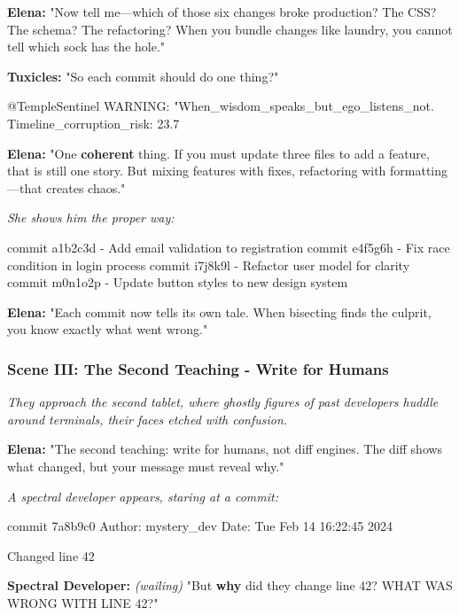 \textbf{Elena:} "Now tell me---which of those six changes broke production? The CSS? The schema? The refactoring? When you bundle changes like laundry, you cannot tell which sock has the hole."

\textbf{Tuxicles:} "So each commit should do one thing?"

\begin{codeblock}
@TempleSentinel WARNING: "When_wisdom_speaks_but_ego_listens_not. Timeline_corruption_risk: 23.7%
\end{codeblock}

\textbf{Elena:} "One \textbf{coherent} thing. If you must update three files to add a feature, that is still one story. But mixing features with fixes, refactoring with formatting---that creates chaos."

\emph{She shows him the proper way:}

\begin{codeblock}
commit a1b2c3d - Add email validation to registration
commit e4f5g6h - Fix race condition in login process  
commit i7j8k9l - Refactor user model for clarity
commit m0n1o2p - Update button styles to new design system
\end{codeblock}

\textbf{Elena:} "Each commit now tells its own tale. When bisecting finds the culprit, you know exactly what went wrong."

\bookdivider

\subsubsection{Scene III: The Second Teaching - Write for Humans}\label{scene-iii-the-second-teaching---write-for-humans}

\emph{They approach the second tablet, where ghostly figures of past developers huddle around terminals, their faces etched with confusion.}

\textbf{Elena:} "The second teaching: write for humans, not diff engines. The diff shows what changed, but your message must reveal why."

\emph{A spectral developer appears, staring at a commit:}

\begin{codeblock}
commit 7a8b9c0
Author: mystery_dev
Date: Tue Feb 14 16:22:45 2024

Changed line 42
\end{codeblock}

\textbf{Spectral Developer:} \emph{(wailing)} "But \textbf{why} did they change line 42? WHAT WAS WRONG WITH LINE 42?"


